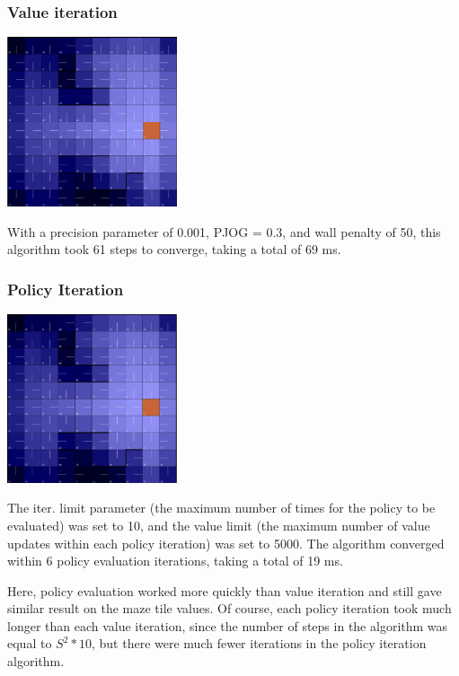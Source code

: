 \documentclass[11pt]{article}
\begin{document}
            \subsubsection{Value iteration}

            \includegraphics[width=5cm]{../images/small/vi.PNG}

            With a precision parameter of 0.001, PJOG = 0.3,
            and wall penalty of 50, this algorithm took 61 steps
            to converge, taking a total of 69 ms.

            \subsubsection{Policy Iteration}

            \includegraphics[width=5cm]{../images/small/pi.PNG}

            The iter. limit parameter (the maximum number
            of times for the policy to be evaluated) was set
            to 10, and the value limit (the maximum number of
            value updates within each policy iteration) was
            set to 5000. The algorithm converged within 6 policy
            evaluation iterations, taking a total of 19 ms.


            Here, policy evaluation worked more quickly than value iteration and
            still gave similar result on the maze tile values. Of course, each
            policy iteration took much longer than each value iteration,
            since the number of steps in the algorithm was equal to $S^2 * 10$,
            but there were much fewer iterations in the policy iteration algorithm.
\end{document}
